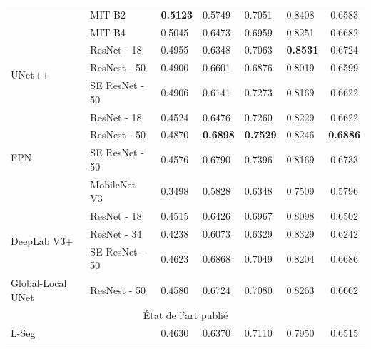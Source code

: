 \begin{table}
\begin{threeparttable}
\begin{tabular}{l lllll c}
			&  \tnote{1} MIT B2 \cite{xieSegFormerSimpleEfficient} & \color{blue}\textbf{0.5123} & 0.5749 & 0.7051 & 0.8408 & 0.6583 \\
			& \tnote{1} MIT B4 & 0.5045 & 0.6473 & 0.6959 & 0.8251 & 0.6682 \\
			\midrule
			\multirow{3}{3em}{UNet++ \cite{zhouUNetNestedUNet2018}} & ResNet - 18 & 0.4955 & 0.6348 & 0.7063 & \color{blue}\textbf{0.8531} & 0.6724 \\
			& ResNest - 50 & 0.4900 & 0.6601 & 0.6876 & 0.8019 & 0.6599 \\
			& SE ResNet - 50 & 0.4906 & 0.6141 & 0.7273 & 0.8169 & 0.6622 \\
			\midrule
			\multirow{4}{3em}{FPN \cite{seferbekovFeaturePyramidNetwork2018}} & ResNet - 18 & 0.4524 & 0.6476 & 0.7260 & 0.8229 & 0.6622 \\
			& ResNest - 50 & 0.4870 & \color{blue}\textbf{0.6898} & \color{blue}\textbf{0.7529} & 0.8246 & \color{blue}\textbf{0.6886} \\
			& SE ResNet - 50 & 0.4576 & 0.6790 & 0.7396 & 0.8169 & 0.6733 \\
			& MobileNet V3 \cite{sandlerMobileNetV2InvertedResiduals2018} & 0.3498 & 0.5828 & 0.6348 & 0.7509 & 0.5796 \\
			\midrule
			\multirow{3}{3em}{DeepLab V3+ \cite{chenDeepLabSemanticImage2018}} & ResNet - 18 & 0.4515 & 0.6426 & 0.6967 & 0.8098 & 0.6502 \\
			& ResNet - 34 & 0.4238 & 0.6073 & 0.6329 & 0.8329 & 0.6242 \\
			& SE ResNet - 50 & 0.4623 & 0.6868 & 0.7049 & 0.8204 & 0.6686 \\
			\midrule
			\tnote{3} Global-Local UNet & ResNest - 50 & 0.4580 & 0.6724 & 0.7080 & 0.8263 & 0.6662 \\
			\midrule
			\multicolumn{7}{c}{État de l'art publié}\\
			\midrule
			\multicolumn{2}{l}{L-Seg \cite{guoLSegEndtoendUnified2019}} & 0.4630 & 0.6370  & 0.7110 & 0.7950 & 0.6515 \\
			

\end{tabular}
\end{threeparttable}
\end{table}
